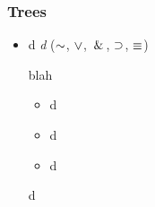 \begin{frame}
\frametitle{Trees}

  \begin{itemize}[<+->]
    \item d
    \emph{d} ($\enot$, $\vee$, $\,\&\,$, $\supset$, $\equiv$)
  
  \begin{block}{blah}
    \begin{itemize}[<+->]
      \item[] d

  \item[] d

  \item[] d
\end{itemize} 
\end{block}

  \begin{definition}
  d
  \end{definition}


\end{itemize}
\end{frame}

\fi 